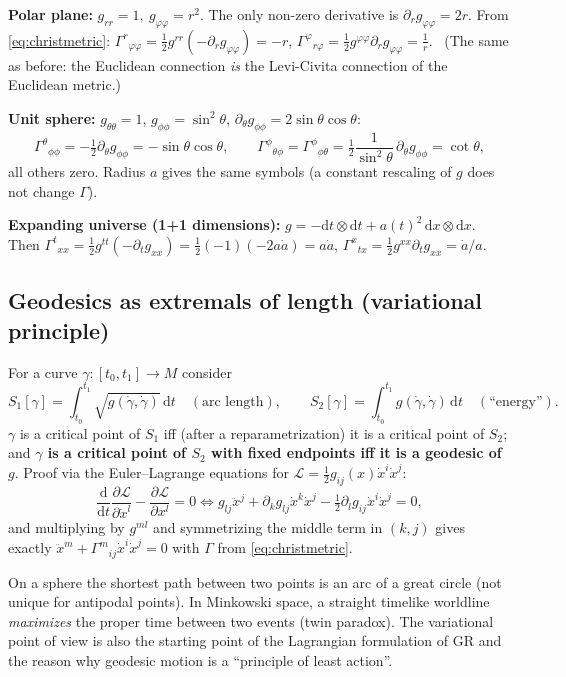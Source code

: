 \documentclass[11pt,a4paper]{article}
\numberwithin{equation}{section}
\theoremstyle{definition}
\theoremstyle{plain}
\newcommand{\dd}{\mathrm{d}}
\begin{document}
\begin{example}
\textbf{Polar plane:} $g_{rr}=1,\ g_{\varphi\varphi}=r^2$. The only non-zero derivative is $\partial_rg_{\varphi\varphi}=2r$. From \eqref{eq:christmetric}: $\Gamma^r{}_{\varphi\varphi}=\frac12g^{rr}(-\partial_rg_{\varphi\varphi})=-r$, $\Gamma^\varphi{}_{r\varphi}=\frac12g^{\varphi\varphi}\partial_rg_{\varphi\varphi}=\frac1r$. \checkmark\ (The same as before: the Euclidean connection \emph{is} the Levi-Civita connection of the Euclidean metric.)

\textbf{Unit sphere:} $g_{\theta\theta}=1$, $g_{\phi\phi}=\sin^2\theta$, $\partial_\theta g_{\phi\phi}=2\sin\theta\cos\theta$:
\[
\Gamma^\theta{}_{\phi\phi}=-\tfrac12\partial_\theta g_{\phi\phi}=-\sin\theta\cos\theta,\qquad
\Gamma^\phi{}_{\theta\phi}=\Gamma^\phi{}_{\phi\theta}=\tfrac12\frac{1}{\sin^2\theta}\,\partial_\theta g_{\phi\phi}=\cot\theta,
\]
all others zero. Radius $a$ gives the same symbols (a constant rescaling of $g$ does not change $\Gamma$).

\textbf{Expanding universe (1+1 dimensions):} $g=-\dd t\otimes\dd t+a(t)^2\,\dd x\otimes\dd x$. Then $\Gamma^t{}_{xx}=\tfrac12g^{tt}(-\partial_tg_{xx})=\tfrac12(-1)(-2a\dot a)=a\dot a$, $\Gamma^x{}_{tx}=\tfrac12g^{xx}\partial_tg_{xx}=\dot a/a$.
\end{example}

\subsection{Geodesics as extremals of length (variational principle)}
\begin{formal}
For a curve $\gamma:[t_0,t_1]\to M$ consider
\[
S_1[\gamma]=\int_{t_0}^{t_1}\sqrt{g(\dot\gamma,\dot\gamma)}\,\dd t\quad(\text{arc length}),\qquad
S_2[\gamma]=\int_{t_0}^{t_1}g(\dot\gamma,\dot\gamma)\,\dd t\quad(\text{``energy''}).
\]
$\gamma$ is a critical point of $S_1$ iff (after a reparametrization) it is a critical point of $S_2$; and \textbf{$\gamma$ is a critical point of $S_2$ with fixed endpoints iff it is a geodesic of $g$}. Proof via the Euler--Lagrange equations for $\mathcal L=\tfrac12g_{ij}(x)\dot x^i\dot x^j$:
\[
\frac{\dd}{\dd t}\frac{\partial\mathcal L}{\partial\dot x^l}-\frac{\partial\mathcal L}{\partial x^l}=0\iff g_{lj}\ddot x^j+\partial_kg_{lj}\dot x^k\dot x^j-\tfrac12\partial_lg_{ij}\dot x^i\dot x^j=0,
\]
and multiplying by $g^{ml}$ and symmetrizing the middle term in $(k,j)$ gives exactly $\ddot x^m+\Gamma^m{}_{ij}\dot x^i\dot x^j=0$ with $\Gamma$ from \eqref{eq:christmetric}.
\end{formal}
\begin{intuition}
On a sphere the shortest path between two points is an arc of a great circle (not unique for antipodal points). In Minkowski space, a straight timelike worldline \emph{maximizes} the proper time between two events (twin paradox). The variational point of view is also the starting point of the Lagrangian formulation of GR and the reason why geodesic motion is a ``principle of least action''.
\end{intuition}
\end{document}
